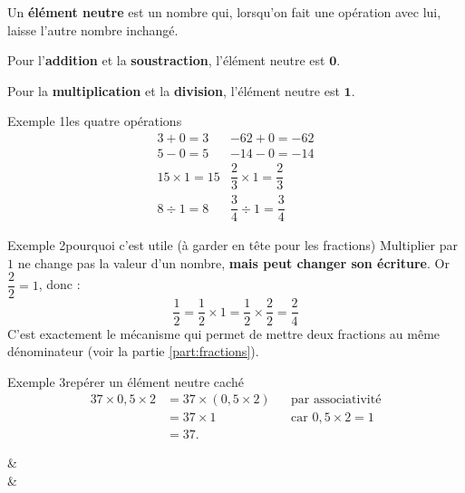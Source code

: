 \begin{theorie}
Un \textbf{élément neutre} est un nombre qui, lorsqu'on fait une opération avec lui,
laisse l'autre nombre inchangé.

\begin{compactitem}
\item Pour l'\textbf{addition} et la \textbf{soustraction}, l'élément neutre est $\mathbf{0}$.
\item Pour la \textbf{multiplication} et la \textbf{division}, l'élément neutre est $\mathbf{1}$.
\end{compactitem}
\end{theorie}

\begin{exemple}{Exemple 1}{les quatre opérations}
\[
\begin{array}{ll}
  3 + 0 = 3 & -62 + 0 = -62 \\
  5 - 0 = 5 & -14 - 0 = -14 \\
  15 \times 1 = 15 & \dfrac{2}{3} \times 1 = \dfrac{2}{3} \\[0.8em]
  8 \div 1 = 8 & \dfrac{3}{4} \div 1 = \dfrac{3}{4}
\end{array}
\]
\end{exemple}

\begin{exemple}{Exemple 2}{pourquoi c'est utile (à garder en tête pour les fractions)}
Multiplier par $1$ ne change pas la valeur d'un nombre, \textbf{mais peut changer son
écriture}. Or $\dfrac{2}{2} = 1$, donc :
\[ \frac{1}{2} = \frac{1}{2} \times 1 = \frac{1}{2} \times \frac{2}{2} = \frac{2}{4} \]
C'est exactement le mécanisme qui permet de mettre deux fractions au même
dénominateur (voir la partie \ref{part:fractions}).
\end{exemple}

\begin{exemple}{Exemple 3}{repérer un élément neutre caché}
\begin{align*}
  37 \times 0{,}5 \times 2 &= 37 \times (0{,}5 \times 2) &&\text{par associativité} \\
                           &= 37 \times 1                &&\text{car } 0{,}5 \times 2 = 1 \\
                           &= 37.
\end{align*}
\end{exemple}

\begin{exos}
  &  \\
   &  \\
\end{exos}

